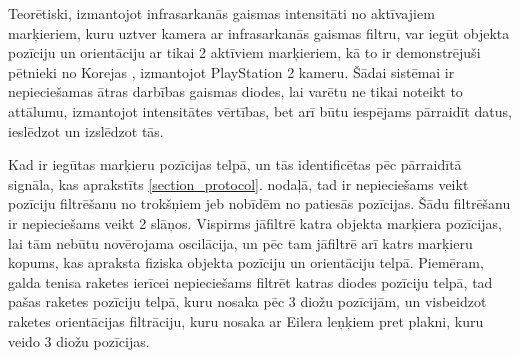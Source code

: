 \documentclass[12pt, a4paper, oneside, openright]{article}
\begin{document}
\par
Teorētiski, izmantojot infrasarkanās gaismas intensitāti no aktīvajiem marķieriem, kuru uztver 
kamera ar infrasarkanās gaismas filtru, var iegūt objekta pozīciju un orientāciju ar tikai 2 aktīviem marķieriem,
kā to ir demonstrējuši pētnieki no Korejas \cite{ChangHoHan2009}, izmantojot PlayStation 2 kameru.
Šādai sistēmai ir nepieciešamas ātras darbības gaismas diodes, lai varētu ne tikai noteikt
to attālumu, izmantojot intensitātes vērtības, bet arī būtu iespējams pārraidīt datus, ieslēdzot
un izslēdzot tās.


\par
Kad ir iegūtas marķieru pozīcijas telpā, un tās identificētas pēc pārraidītā signāla, kas
aprakstīts \ref{section_protocol}. nodaļā, tad ir nepieciešams veikt pozīciju filtrēšanu no
trokšņiem jeb nobīdēm no patiesās pozīcijas. Šādu filtrēšanu ir nepieciešams veikt 2 slāņos.
Vispirms jāfiltrē katra objekta marķiera pozīcijas, lai tām nebūtu novērojama oscilācija,
un pēc tam jāfiltrē arī katrs marķieru kopums, kas apraksta fiziska objekta pozīciju un orientāciju telpā.
Piemēram, galda tenisa raketes ierīcei nepieciešams filtrēt katras diodes pozīciju telpā, tad
pašas raketes pozīciju telpā, kuru nosaka pēc 3 diožu pozīcijām, un visbeidzot raketes orientācijas
filtrāciju, kuru nosaka ar Eilera leņķiem pret plakni, kuru veido 3 diožu pozīcijas.
\end{document}
